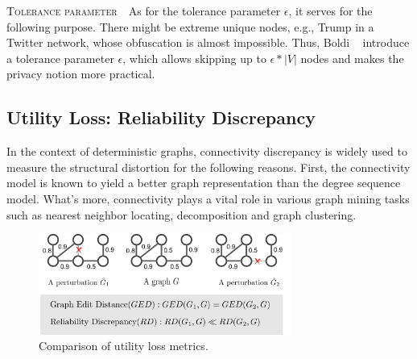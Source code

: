 \textsc{Tolerance parameter}~~As for the tolerance parameter $\epsilon$, it serves for the following purpose. There might be extreme unique nodes, e.g., Trump in a Twitter network, whose obfuscation is almost impossible. Thus, Boldi {\etal}~\cite{Boldi_Injecting_2012} introduce a tolerance parameter $\epsilon$, which allows skipping up to $\epsilon * |V|$ nodes and makes the privacy notion more practical. 
\subsection{Utility Loss: Reliability Discrepancy}

In the context of deterministic graphs, connectivity discrepancy is widely used to measure the structural distortion for the following reasons. 
First, the connectivity model is known to yield a better graph representation than the degree sequence model.
What's more, connectivity plays a vital role in various graph mining tasks such as nearest neighbor locating, decomposition and graph clustering. 
\begin{figure}[!htb]
  \centering
  \includegraphics[height=3.3cm]{ill/UL.pdf}
  \vspace{-4pt}
  \caption{Comparison of utility loss metrics.}
  \label{fig:utility_loss}
\end{figure} 


